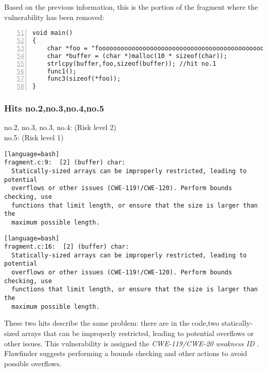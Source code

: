 \documentclass[a4paper,12pt]{article}
\begin{document}
\noindent
Based on the previous information, this is the portion of the fragment where the vulnerability has been removed:
\begin{lstlisting}[style=c,numbers=left,firstnumber=51,linebackgroundcolor={\ifnum\value{lstnumber}=55\color{green}\fi}]
void main()
{
	char *foo = "fooooooooooooooooooooooooooooooooooooooooooooooooooo";
	char *buffer = (char *)malloc(10 * sizeof(char));
	strlcpy(buffer,foo,sizeof(buffer)); //hit no.1
	func1();
	func3(sizeof(*foo));
}
\end{lstlisting}

\break
\subsubsection{Hits no.2,no.3,no.4,no.5}
no.2, no.3, no.3, no.4: (Risk level 2)\\
no.5: (Risk level 1)
\begin{lstlisting}[style=DOS][language=bash]
fragment.c:9:  [2] (buffer) char:
  Statically-sized arrays can be improperly restricted, leading to potential
  overflows or other issues (CWE-119!/CWE-120). Perform bounds checking, use
  functions that limit length, or ensure that the size is larger than the
  maximum possible length.
\end{lstlisting}

\begin{lstlisting}[style=DOS][language=bash]
fragment.c:16:  [2] (buffer) char:
  Statically-sized arrays can be improperly restricted, leading to potential
  overflows or other issues (CWE-119!/CWE-120). Perform bounds checking, use
  functions that limit length, or ensure that the size is larger than the
  maximum possible length.
\end{lstlisting}
These two hits describe the same problem: there are in the code,two statically-sized arrays that can be improperly restricted, leading to potential overflows or other issues. This vulnerability is assigned the \textit{CWE-119/CWE-20 weakness ID} \cite{CWE}.	\\
Flawfinder suggests performing a bounds checking and other actions to avoid possible overflows.
\end{document}
